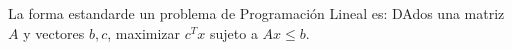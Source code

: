 \documentclass{article}
\begin{document}
La forma estandarde un problema de Programación Lineal es: DAdos una
matriz  $A$ y vectores $b,c$, maximizar $c^Tx$ sujeto a $Ax\leq b$.
\end{document}
